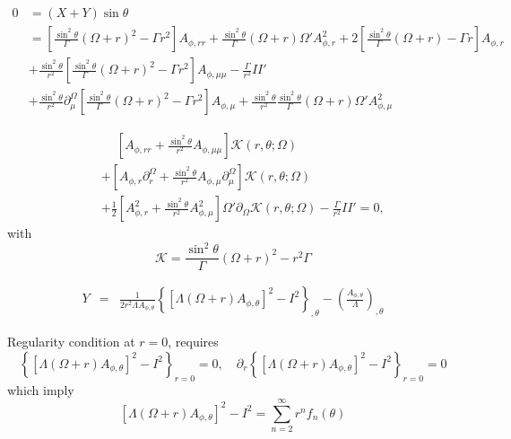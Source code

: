 \documentclass[aps,prd,preprint,groupedaddress]{revtex4-1}
\def\nn{\nonumber}
\def\beq{\begin{equation}}
\def\beqn{\begin{eqnarray}}
\def\eeq{\end{equation}}
\def\eeqn{\end{eqnarray}}
\def\st{\sin\theta}
\def\sst{\sin^2\theta}
\def\Ar{A_{\phi,r}}
\def\Ah{A_{\phi,\theta}}
\def\Arr{A_{\phi,rr}}
\def\Am{A_{\phi,\mu}}
\def\Amm{A_{\phi,\mu\mu}}
\begin{document}
\beq
\begin{aligned}
    0 & = (X+Y)\st \\
    & = \left[\frac{\sst}{\Gamma}(\Omega+r)^2-\Gamma r^2\right] \Arr + \frac{\sst}{\Gamma}(\Omega+r)\Omega'\Ar^2
    +2\left[\frac{\sst}{\Gamma} (\Omega +r) - \Gamma r\right]\Ar \\
    & + \frac{\sst}{r^2} \left[\frac{\sst}{\Gamma}(\Omega+r)^2-\Gamma r^2\right]\Amm-\frac{\Gamma}{r^2}II' \nn \\
    & +
    \frac{\sst}{r^2}\partial_\mu^\Omega \left[\frac{\sst}{\Gamma}(\Omega+r)^2-\Gamma r^2\right]\Am
    + \frac{\sst}{r^2} \frac{\sst}{\Gamma} (\Omega+r) \Omega' \Am^2
\end{aligned}
\eeq

\beqn
&&\phantom{+}
 \left[\Arr + \frac{\sst}{r^2}\Amm \right]  \mathcal K(r,\theta; \Omega )\nn \\
&&
+\left[\Ar \partial_r^\Omega  +  \frac{\sst}{r^2}\Am \partial_\mu^\Omega\right] \mathcal K(r,\theta; \Omega ) \nn \\
&&
+ \frac{1}{2}\left[\Ar^2 + \frac{\sst}{r^2}\Am^2\right]  \Omega' \partial_\Omega \mathcal K(r,\theta; \Omega )
- \frac{\Gamma}{r^2}II' = 0,
\eeqn
with
\beq
\mathcal K = \frac{\sst}{\Gamma}(\Omega+r)^2 - r^2\Gamma
\eeq

\beqn
Y&=&
\frac{1}{2r^2\Lambda \Ah}\left\{\left[\Lambda(\Omega+r)\Ah \right]^2 -I^2 \right\}_{,\theta}
-\left(\frac{ \Ah}{\Lambda}\right)_{,\theta}
\eeqn

Regularity condition at $r=0$, requires
\[\left\{ [\Lambda(\Omega+r)\Ah ]^2 -I^2 \right\}_{r=0} = 0, \quad \partial_r\left\{ [\Lambda(\Omega+r)\Ah ]^2 -I^2 \right\}_{r=0}  = 0  \]
which imply
\beq
\left[\Lambda(\Omega+r)\Ah \right]^2 -I^2 = \sum_{n=2}^{\infty} r^n f_n(\theta)
\eeq
\end{document}
